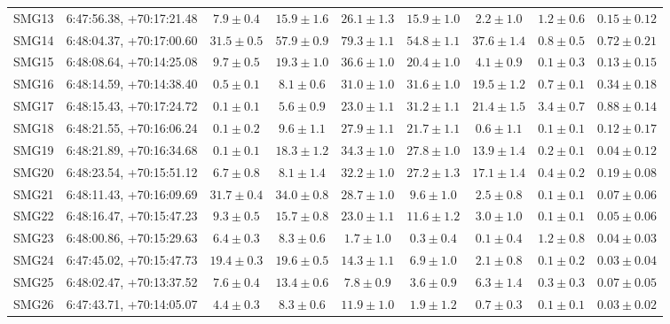 \documentclass[traditabstract]{aa}
\begin{document}
\begin{table}[h]
\begin{center}
\begin{tabular}{ccccccccc}
SMG13 & 6:47:56.38, +70:17:21.48 & $7.9\pm 0.4$ & $15.9\pm 1.6$ & $26.1\pm 1.3$ & $15.9\pm 1.0$ & $2.2\pm  1.0$& $1.2\pm  0.6$ & $0.15\pm  0.12$\\
SMG14 & 6:48:04.37, +70:17:00.60 & $31.5\pm 0.5$ & $57.9\pm 0.9$ & $79.3\pm 1.1$ & $54.8\pm 1.1$ & $37.6\pm  1.4$& $0.8\pm  0.5$ & $0.72\pm  0.21$\\
SMG15 & 6:48:08.64, +70:14:25.08 & $9.7\pm 0.5$ & $19.3\pm 1.0$ & $36.6\pm 1.0$ & $20.4\pm 1.0$ & $4.1\pm  0.9$& $0.1\pm  0.3$ & $0.13\pm  0.15$\\
SMG16 & 6:48:14.59, +70:14:38.40 & $0.5\pm 0.1$ & $8.1\pm 0.6$ & $31.0\pm 1.0$ & $31.6\pm 1.0$ & $19.5\pm  1.2$& $0.7\pm  0.1$ & $0.34\pm  0.18$\\
SMG17 & 6:48:15.43, +70:17:24.72 & $0.1\pm 0.1$ & $5.6\pm 0.9$ & $23.0\pm 1.1$ & $31.2\pm 1.1$ & $21.4\pm  1.5$& $3.4\pm  0.7$ & $0.88\pm  0.14$\\
SMG18 & 6:48:21.55, +70:16:06.24 & $0.1\pm 0.2$ & $9.6\pm 1.1$ & $27.9\pm 1.1$ & $21.7\pm 1.1$ & $0.6\pm  1.1$& $0.1\pm  0.1$ & $0.12\pm  0.17$\\
SMG19 & 6:48:21.89, +70:16:34.68 & $0.1\pm 0.1$ & $18.3\pm 1.2$ & $34.3\pm 1.0$ & $27.8\pm 1.0$ & $13.9\pm  1.4$& $0.2\pm  0.1$ & $0.04\pm  0.12$\\
SMG20 & 6:48:23.54, +70:15:51.12 & $6.7\pm 0.8$ & $8.1\pm 1.4$ & $32.2\pm 1.0$ & $27.2\pm 1.3$ & $17.1\pm  1.4$& $0.4\pm  0.2$ & $0.19\pm  0.08$\\
SMG21 & 6:48:11.43, +70:16:09.69 & $31.7\pm 0.4$ & $34.0\pm 0.8$ & $28.7\pm 1.0$ & $9.6\pm 1.0$ & $2.5\pm  0.8$& $0.1\pm  0.1$ & $0.07\pm  0.06$\\
SMG22 & 6:48:16.47, +70:15:47.23 & $9.3\pm 0.5$ & $15.7\pm 0.8$ & $23.0\pm 1.1$ & $11.6\pm 1.2$ & $3.0\pm  1.0$& $0.1\pm  0.1$ & $0.05\pm  0.06$\\
SMG23 & 6:48:00.86, +70:15:29.63 & $6.4\pm 0.3$ & $8.3\pm 0.6$ & $1.7\pm 1.0$ & $0.3\pm 0.4$ & $0.1\pm  0.4$& $1.2\pm  0.8$ & $0.04\pm  0.03$\\
SMG24 & 6:47:45.02, +70:15:47.73 & $19.4\pm 0.3$ & $19.6\pm 0.5$ & $14.3\pm 1.1$ & $6.9\pm 1.0$ & $2.1\pm  0.8$& $0.1\pm  0.2$ & $0.03\pm  0.04$\\
SMG25 & 6:48:02.47, +70:13:37.52 & $7.6\pm 0.4$ & $13.4\pm 0.6$ & $7.8\pm 0.9$ & $3.6\pm 0.9$ & $6.3\pm  1.4$& $0.3\pm  0.3$ & $0.07\pm  0.05$\\
SMG26 & 6:47:43.71, +70:14:05.07 & $4.4\pm 0.3$ & $8.3\pm 0.6$ & $11.9\pm 1.0$ & $1.9\pm 1.2$ & $0.7\pm  0.3$& $0.1\pm  0.1$ & $0.03\pm  0.02$\\

\end{tabular}
\end{center}
\end{table}
\end{document}

